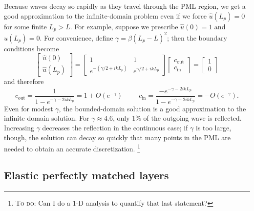 \documentclass{article}
\newcommand{\note}[1]{\footnote{\textsc{To do}: #1}}
\begin{document}
Because waves decay so rapidly as they travel through the PML region,
we get a good approximation to the infinite-domain problem even if we
force $\hat{u}(L_p) = 0$ for some finite $L_p > L$.  For example,
suppose we prescribe $\hat{u}(0) = 1$ and $\hat{u}(L_p) = 0$.  For
convenience, define $\gamma = \beta(L_p-L)^2$; then the boundary
conditions become
\begin{equation}
  \begin{bmatrix}
    \hat{u}(0) \\ \hat{u}(L_p)
  \end{bmatrix} =
  \begin{bmatrix}
    1 & 1 \\
    e^{-(\gamma/2 + ikL_p)} & e^{\gamma/2 + ikL_p}
  \end{bmatrix}
  \begin{bmatrix}
    c_\mathrm{out} \\ c_\mathrm{in}
  \end{bmatrix} =
  \begin{bmatrix} 1 \\ 0 \end{bmatrix}
\end{equation}
and therefore
\begin{equation}
  c_\mathrm{out} = \frac{1}{1 - e^{-\gamma-2ikL_p}} 
                 = 1 + O(e^{-\gamma})
\hspace{1cm}
  c_\mathrm{in} = \frac{-e^{-\gamma-2ikL_p}}{1 - e^{-\gamma-2ikL_p}}
                = -O(e^{-\gamma}).
\end{equation}
Even for modest $\gamma$, the bounded-domain solution is a good
approximation to the infinite domain solution.  For $\gamma \approx
4.6$, only 1\% of the outgoing wave is reflected.
Increasing $\gamma$ decreases the reflection in the continuous case; 
if $\gamma$ is too large, though, the solution can decay so quickly that
many points in the PML are needed to obtain an accurate discretization.
\note{
  Can I do a 1-D analysis to quantify that last statement?
}


\subsection{Elastic perfectly matched layers}
\label{elastic-pml-section}
\end{document}
